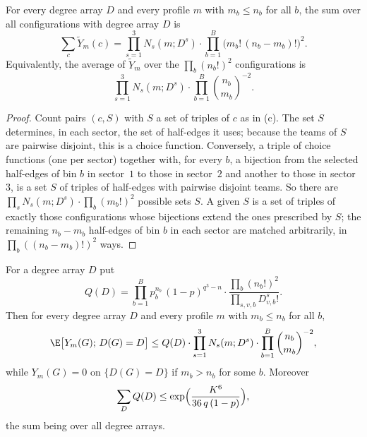 \begin{lemma}\label{lem:iid-count}
For every degree array $D$ and every profile $m$ with $m_b\le n_b$ for all $b$, the sum
over all configurations with degree array $D$ is
\[
\sum_c\widetilde Y_m(c)=\prod_{s=1}^3N_s(m;D^s)\cdot\prod_{b=1}^B\bigl(m_b!\,(n_b-m_b)!\bigr)^2 .
\]
Equivalently, the average of $\widetilde Y_m$ over the $\prod_b(n_b!)^2$ configurations
is
\[
\prod_{s=1}^3N_s(m;D^s)\cdot\prod_{b=1}^B\binom{n_b}{m_b}^{-2}.
\]
\end{lemma}

\begin{proof}
Count pairs $(c,S)$ with $S$ a set of triples of $c$ as in (c). The set $S$ determines, in
each sector, the set of half-edges it uses; because the teams of $S$ are pairwise disjoint,
this is a choice function. Conversely, a triple of choice functions (one per sector)
together with, for every $b$, a bijection from the selected half-edges of bin $b$ in
sector~$1$ to those in sector~$2$ and another to those in sector~$3$, is a set $S$ of
triples of half-edges with pairwise disjoint teams. So there are
$\prod_sN_s(m;D^s)\cdot\prod_b(m_b!)^2$ possible sets $S$. A given $S$ is a set of triples
of exactly those configurations whose bijections extend the ones prescribed by $S$; the
remaining $n_b-m_b$ half-edges of bin $b$ in each sector are matched arbitrarily, in
$\prod_b((n_b-m_b)!)^2$ ways.
\end{proof}

\begin{lemma}\label{lem:iid-simple}
For a degree array $D$ put
\[
Q(D)=\prod_{b=1}^Bp_b^{n_b}\,(1-p)^{q^3-n}\cdot
\frac{\prod_{b}(n_b!)^2}{\prod_{s,v,b}D^s_{v,b}!}.
\]
Then for every degree array $D$ and every profile $m$ with $m_b\le n_b$ for all $b$,
\begin{equation}\label{eq:iid-simple}
\E\bigl[Y_m(G);\,D(G)=D\bigr]\le Q(D)\cdot\prod_{s=1}^3N_s(m;D^s)\cdot
\prod_{b=1}^B\binom{n_b}{m_b}^{-2},
\end{equation}
while $Y_m(G)=0$ on $\{D(G)=D\}$ if $m_b>n_b$ for some $b$. Moreover
\begin{equation}\label{eq:iid-Qsum}
\sum_DQ(D)\le\exp\Bigl(\frac{K^6}{36\,q\,(1-p)}\Bigr),
\end{equation}
the sum being over all degree arrays.
\end{lemma}

